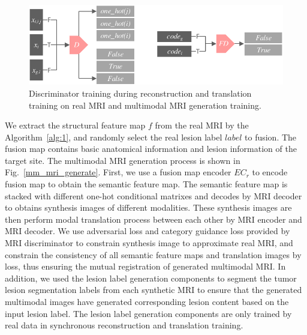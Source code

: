 \documentclass[letterpaper]{article} %
\begin{document}
\begin{figure}
	\centering
	\includegraphics[width=0.75\columnwidth]{figures/D}
	\caption{Discriminator training during reconstruction and translation training on real MRI and multimodal MRI generation training.}
	\label{train_D}
\end{figure}
We extract the structural feature map $f$ from the real MRI by the Algorithm~\ref{alg:1}, and randomly select the real lesion label $label$ to fusion. The fusion map contains basic anatomical information and lesion information of the target site. The multimodal MRI generation process is shown in Fig.~\ref{mm_mri_generate}. First, we use a fusion map encoder $EC_r$ to encode fusion map to obtain the semantic feature map. The semantic feature map is stacked with different one-hot conditional matrixes and decodes by MRI decoder to obtains synthesis images of different modalities. These synthesis images are then perform modal translation process between each other by MRI encoder and MRI decoder. We use adversarial loss and category guidance loss provided by MRI discriminator to constrain synthesis image to approximate real MRI, and constrain the consistency of all semantic feature maps and translation images by loss, thus ensuring the mutual registration of generated multimodal MRI. In addition, we used the lesion label generation components to segment the tumor lesion segmentation labels from each synthetic MRI to ensure that the generated multimodal images have generated corresponding lesion content based on the input lesion label. The lesion label generation components are only trained by real data in synchronous reconstruction and translation training. 
\end{document}
